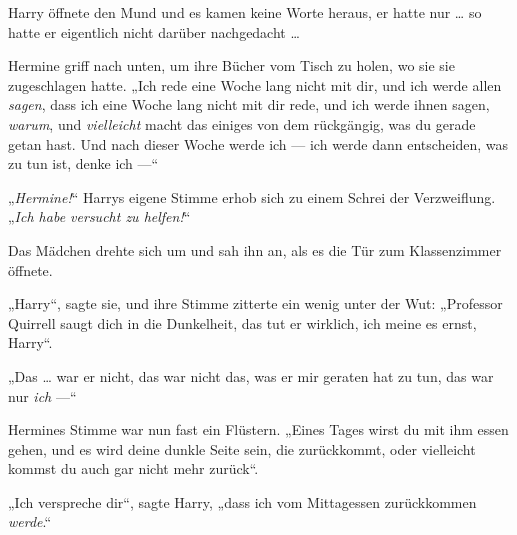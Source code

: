 Harry öffnete den Mund und es kamen keine Worte heraus, er hatte nur … so hatte er eigentlich nicht darüber nachgedacht …

Hermine griff nach unten, um ihre Bücher vom Tisch zu holen, wo sie sie zugeschlagen hatte.
„Ich rede eine Woche lang nicht mit dir, und ich werde allen \emph{sagen}, dass ich eine Woche lang nicht mit dir rede, und ich werde ihnen sagen, \emph{warum}, und \emph{vielleicht} macht das einiges von dem rückgängig, was du gerade getan hast. Und nach dieser Woche werde ich — ich werde dann entscheiden, was zu tun ist, denke ich —“

„\emph{Hermine!}“ Harrys eigene Stimme erhob sich zu einem Schrei der Verzweiflung.
„\emph{Ich habe versucht zu helfen!}“

Das Mädchen drehte sich um und sah ihn an, als es die Tür zum Klassenzimmer öffnete.

„Harry“, sagte sie, und ihre Stimme zitterte ein wenig unter der Wut:
„Professor Quirrell saugt dich in die Dunkelheit, das tut er wirklich, ich meine es ernst, Harry“.

„Das … war er nicht, das war nicht das, was er mir geraten hat zu tun, das war nur \emph{ich} —“

Hermines Stimme war nun fast ein Flüstern.
„Eines Tages wirst du mit ihm essen gehen, und es wird deine dunkle Seite sein, die zurückkommt, oder vielleicht kommst du auch gar nicht mehr zurück“.

„Ich verspreche dir“, sagte Harry, „dass ich vom Mittagessen zurückkommen \emph{werde}.“


